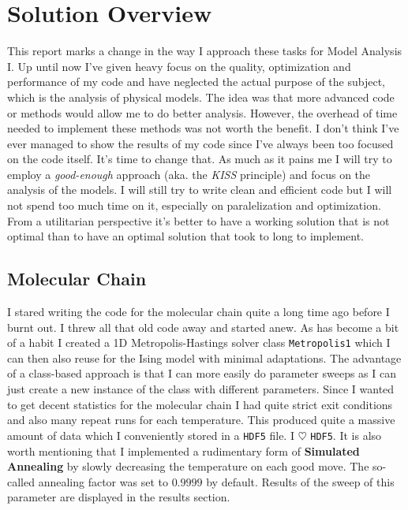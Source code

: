 \documentclass[10pt, titlepage, a4paper]{article}
\begin{document}
\section{Solution Overview}
This report marks a change in the way I approach these tasks for Model Analysis I. Up until now I've given heavy focus on the quality, optimization 
and performance of my code and have neglected the actual purpose of the subject, which is the analysis of physical models. The idea was that more 
advanced code or methods would allow me to do better analysis. However, the overhead of time needed to implement these methods was not worth the
benefit. I don't think I've ever managed to show the results of my code since I've always been too focused on the code itself. It's time to change
that. As much as it pains me I will try to employ a \textit{good-enough} approach (aka. the \textit{KISS} principle) and focus on the analysis of
the models. I will still try to write clean and efficient code but I will not spend too much time on it, especially on paralelization and optimization.
From a utilitarian perspective it's better to have a working solution that is not optimal than to have an optimal solution that took to long to 
implement. \\

\subsection{Molecular Chain}
I stared writing the code for the molecular chain quite a long time ago before I burnt out. I threw all that old code away and started anew. As has 
become a bit of a habit I created a 1D Metropolis-Hastings solver class \texttt{Metropolis1} which I can then also reuse for the Ising model 
with minimal adaptations. The advantage of a class-based approach is that I can more easily do parameter sweeps as I can just create a new instance
of the class with different parameters. Since I wanted to get decent statistics for the molecular chain I had quite strict exit conditions and also 
many repeat runs for each temperature. This produced quite a massive amount of data which I conveniently stored in a \texttt{HDF5} file. I $\heartsuit$
\texttt{HDF5}. It is also worth mentioning that I implemented a rudimentary form of \textbf{Simulated Annealing} by slowly decreasing the 
temperature on each good move. The so-called annealing factor was set to $0.9999$ by default. Results of the sweep of this parameter are 
displayed in the results section. \\
\end{document}
